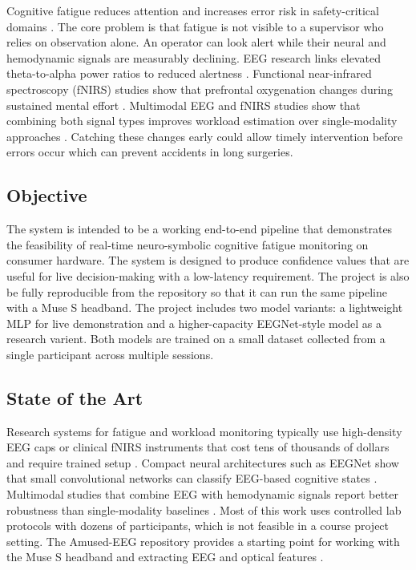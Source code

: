 \documentclass[conference]{IEEEtran}
\begin{document}
Cognitive fatigue reduces attention and increases error risk in safety-critical domains \cite{b1}. The core problem is that fatigue is not visible to a supervisor who relies on observation alone. An operator can look alert while their neural and hemodynamic signals are measurably declining. EEG research links elevated theta-to-alpha power ratios to reduced alertness \cite{b2,b3}. Functional near-infrared spectroscopy (fNIRS) studies show that prefrontal oxygenation changes during sustained mental effort \cite{b4,b5}. Multimodal EEG and fNIRS studies show that combining both signal types improves workload estimation over single-modality approaches \cite{b7,b9}. Catching these changes early could allow timely intervention before errors occur which can prevent accidents in long surgeries.

\subsection{Objective}

The system is intended to be a working end-to-end pipeline that demonstrates the feasibility of real-time neuro-symbolic cognitive fatigue monitoring on consumer hardware. The system is designed to produce confidence values that are useful for live decision-making with a low-latency requirement. The project is also be fully reproducible from the repository so that it can run the same pipeline with a Muse S headband. The project includes two model variants: a lightweight MLP for live demonstration and a higher-capacity EEGNet-style model as a research varient. Both models are trained on a small dataset collected from a single participant across multiple sessions.

\subsection{State of the Art}

Research systems for fatigue and workload monitoring typically use high-density EEG caps or clinical fNIRS instruments that cost tens of thousands of dollars and require trained setup \cite{b4,b5}. Compact neural architectures such as EEGNet show that small convolutional networks can classify EEG-based cognitive states \cite{b2}. Multimodal studies that combine EEG with hemodynamic signals report better robustness than single-modality baselines \cite{b7,b9}. Most of this work uses controlled lab protocols with dozens of participants, which is not feasible in a course project setting. The Amused-EEG repository provides a starting point for working with the Muse S headband and extracting EEG and optical features \cite{b6}.
\end{document}
